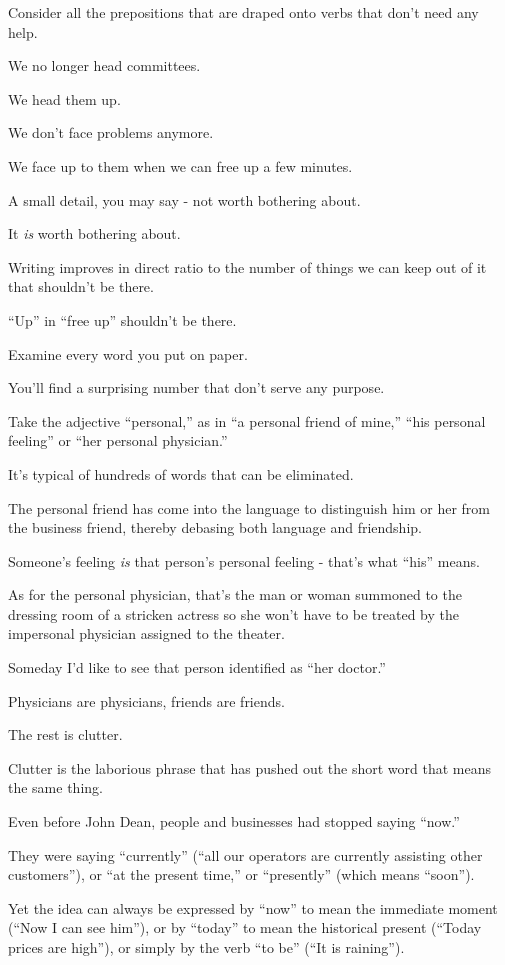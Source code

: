 \documentclass{book}
\numberwithin{equation}{section}
\begin{document}
Consider all the prepositions that are draped onto verbs that don't need any help.

We no longer head committees.

We head them up.

We don't face problems anymore.

We face up to them when we can free up a few minutes.

A small detail, you may say - not worth bothering about.

It \textit{is} worth bothering about.

Writing improves in direct ratio to the number of things we can keep out of it that shouldn't be there.

``Up'' in ``free up'' shouldn't be there.

Examine every word you put on paper.

You'll find a surprising number that don't serve any purpose.

%
Take the adjective ``personal,'' as in ``a personal friend of mine,'' ``his personal feeling'' or ``her personal physician.''

It's typical of hundreds of words that can be eliminated.

The personal friend has come into the language to distinguish him or her from the business friend, thereby debasing both language and friendship.

Someone's feeling \textit{is} that person's personal feeling - that's what ``his'' means.

As for the personal physician, that's the man or woman summoned to the dressing room of a stricken actress so she won't have to be treated by the impersonal physician assigned to the theater.

Someday I'd like to see that person identified as ``her doctor.''

Physicians are physicians, friends are friends.

The rest is clutter.

%
Clutter is the laborious phrase that has pushed out the short word that means the same thing.

Even before John Dean, people and businesses had stopped saying ``now.''

They were saying ``currently'' (``all our operators are currently assisting other customers''), or ``at the present time,'' or ``presently'' (which means ``soon'').

Yet the idea can always be expressed by ``now'' to mean the immediate moment (``Now I can see him''), or by ``today'' to mean the historical present (``Today prices are high''), or simply by the verb ``to be'' (``It is raining'').
\end{document}
